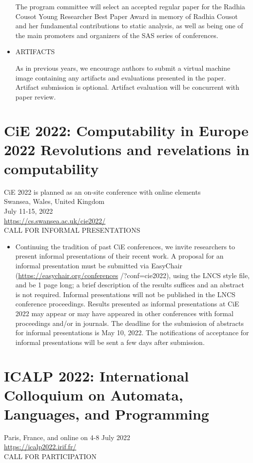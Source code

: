 \documentclass[prodmode,acmtecs]{acmsmall} %
\begin{document}
\begin{itemize}
  The program committee will select an accepted regular paper for the Radhia Cousot Young Researcher Best Paper Award in memory of Radhia Cousot and her fundamental contributions to static analysis, as well as being one of the main promoters and organizers of the SAS series of conferences. 
 
\item  ARTIFACTS 
 
  As in previous years, we encourage authors to submit a virtual machine image containing any artifacts and evaluations presented in the paper. Artifact submission is optional. Artifact evaluation will be concurrent with paper review. 
 
\end{itemize}\section{CiE 2022: Computability in Europe 2022 Revolutions and revelations in computability}\label{CiE2022}  CiE 2022 is planned as an on-site conference with online elements \\ 
  Swansea, Wales, United Kingdom\\ 
  July 11-15, 2022\\ 
  \href{https://cs.swansea.ac.uk/cie2022/}{https://cs.swansea.ac.uk/cie2022/}\\ 
CALL FOR INFORMAL PRESENTATIONS 

\begin{itemize}\item  Continuing the tradition of past CiE conferences, we invite researchers to present informal presentations of their recent work. A proposal for an informal presentation must be submitted via EasyChair (\href{https://easychair.org/conferences}{https://easychair.org/conferences} /?conf=cie2022), using the LNCS style file, and be 1 page long; a brief description of the results suffices and an abstract is not required. Informal presentations will not be published in the LNCS conference proceedings. Results presented as informal presentations at CiE 2022 may appear or may have appeared in other conferences with formal proceedings and/or in journals. The deadline for the submission of abstracts for informal presentations is May 10, 2022. The notifications of acceptance for informal presentations will be sent a few days after submission. 
 
\end{itemize}\section{ICALP 2022: International Colloquium on Automata, Languages, and Programming}\label{ICALP2022}  Paris, France, and online on 4-8 July 2022\\ 
  \href{https://icalp2022.irif.fr/}{https://icalp2022.irif.fr/}\\ 
CALL FOR PARTICIPATION 
\end{document}

